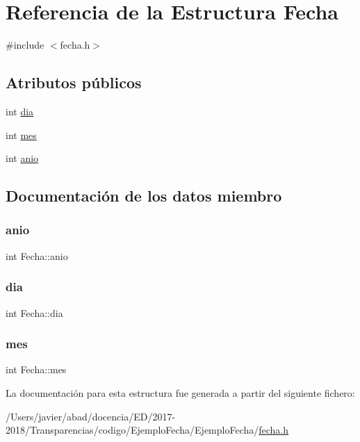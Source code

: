 \hypertarget{struct_fecha}{}\section{Referencia de la Estructura Fecha}
\label{struct_fecha}


{\ttfamily \#include $<$fecha.\+h$>$}

\subsection*{Atributos públicos}
\begin{DoxyCompactItemize}
\item 
int \hyperlink{struct_fecha_ac53f8e215a42333a1a9ff1a87e8e70f7}{dia}
\item 
int \hyperlink{struct_fecha_a92bb43d32ce633e59bd11874c1a4b370}{mes}
\item 
int \hyperlink{struct_fecha_ad596dcd5c981e026d04a83a1c214e759}{anio}
\end{DoxyCompactItemize}


\subsection{Documentación de los datos miembro}
\mbox{\label{struct_fecha_ad596dcd5c981e026d04a83a1c214e759}} 
\subsubsection{\texorpdfstring{anio}{anio}}
{\footnotesize\ttfamily int Fecha\+::anio}

\mbox{\label{struct_fecha_ac53f8e215a42333a1a9ff1a87e8e70f7}} 
\subsubsection{\texorpdfstring{dia}{dia}}
{\footnotesize\ttfamily int Fecha\+::dia}

\mbox{\label{struct_fecha_a92bb43d32ce633e59bd11874c1a4b370}} 
\subsubsection{\texorpdfstring{mes}{mes}}
{\footnotesize\ttfamily int Fecha\+::mes}



La documentación para esta estructura fue generada a partir del siguiente fichero\+:\begin{DoxyCompactItemize}
\item 
/\+Users/javier/abad/docencia/\+E\+D/2017-\/2018/\+Transparencias/codigo/\+Ejemplo\+Fecha/\+Ejemplo\+Fecha/\hyperlink{fecha_8h}{fecha.\+h}\end{DoxyCompactItemize}
